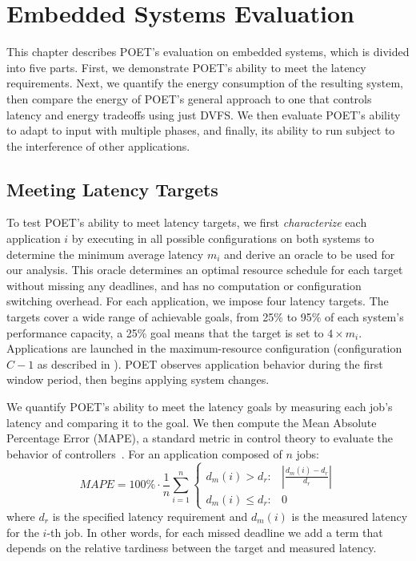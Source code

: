 \section{Embedded Systems Evaluation}
\label{sec:poet-embedded-evaluation}

This chapter describes POET's evaluation on embedded systems, which is divided into five parts.
First, we demonstrate POET's ability to meet the latency requirements.
Next, we quantify the energy consumption of the resulting system, then compare the energy of POET's general approach to one that controls latency and energy tradeoffs using just DVFS.
We then evaluate POET's ability to adapt to input with multiple phases, and finally, its ability to run subject to the interference of other applications.


\subsection{Meeting Latency Targets}
\label{sec:poet-eval-embedded-performance}

To test POET's ability to meet latency targets, we first \emph{characterize} each application $i$ by executing in all possible configurations on both systems to determine the minimum average latency $m_i$ and derive an oracle to be used for our analysis.
This oracle determines an optimal resource schedule for each target without missing any deadlines, and has no computation or configuration switching overhead.
For each application, we impose four latency targets.
The targets cover a wide range of achievable goals, from 25\% to 95\% of each system's performance capacity, \ie a 25\% goal means that the target is set to $4 \times m_i$.
Applications are launched in the maximum-resource configuration (configuration $C-1$ as described in ).
POET observes application behavior during the first window period, then begins applying system changes.

We quantify POET's ability to meet the latency goals by measuring each job's latency and comparing it to the goal.
We then compute the Mean Absolute Percentage Error (MAPE), a standard metric in control theory to evaluate the behavior of controllers~\cite{ICSE2014}.
For an application composed of $n$ jobs:
\begin{equation}
MAPE = 100\% \cdot \frac{1}{n} \sum\limits_{i=1}^{n} 
\left \{
\begin{array}{ll}
d_m(i) > d_{r}  :& \left|\frac{d_m(i) - d_{r}}{d_r} \right| \\
d_m(i) \le d_{r}  :& 0
\end{array} \right.
 \label{eqn:poet-mape}
\end{equation}
where $d_r$ is the specified latency requirement and $d_m(i)$ is the measured latency for the $i$-th job.
In other words, for each missed deadline we add a term that depends on the relative tardiness between the target and measured latency.

